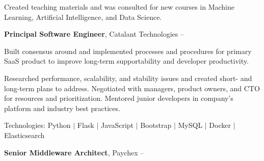 \documentclass[letterpaper,MMMMyyyy,nonstopmode]{simpleresumecv}
\newcommand{\tech}[1]{\textrm{Technologies:} #1}
\newif\ifLOCATION
\begin{document}
\begin{Body}
\begin{Detail}
\end{Detail}

\iffalse %

\Entry
\textbf{Consultant - Logical Operations} \textit{(Part-Time)}
\hfill
Occasionally since \DatestampY{2020}

\ifLOCATION
\hfill 
Rochester, New York
\fi

\begin{Detail}
\BulletItem
Created teaching materials and was consulted for new courses in Machine Learning, Artificial Intelligence, and Data Science.
\end{Detail}
\fi %

\BigGap

\Entry
\textbf{Principal Software Engineer}, Catalant Technologies
\hfill
 -- 

\ifLOCATION
\hfill
Rochester, New York
\fi

\Gap

\begin{Detail}
Built consensus around and implemented processes and procedures for primary SaaS product to improve long-term supportability and developer productivity.

\Gap

\BulletItem
Researched performance, scalability, and stability issues and created short- and long-term plans to address.
Negotiated with managers, product owners, and CTO for resources and prioritization.
\BulletItem Mentored junior developers in company's platform and industry best practices.

\tech{Python $|$ Flask $|$ JavaScript $|$ Bootstrap $|$ MySQL $|$ Docker $|$ Elasticsearch}

\end{Detail}

\BigGap


\Entry
\textbf{Senior Middleware Architect}, Paychex
\hfill
{} -- 


\end{Body}
\end{document}
